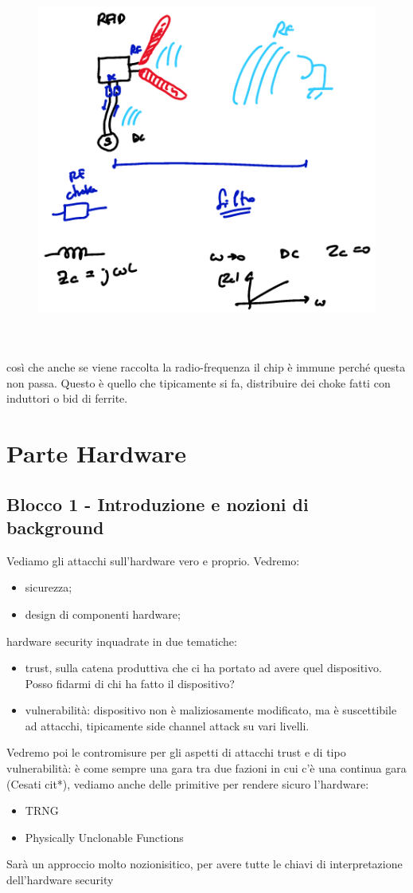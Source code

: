 \documentclass[oneside, 12pt]{extbook}
\begin{document}
\begin{figure}[!h]
	\includegraphics[scale=0.3]{immagini/schermi_chokes.png}
\end{figure}
\\\\così che anche se viene raccolta la radio-frequenza il chip è immune perché questa non passa. Questo è quello che tipicamente si fa, distribuire dei choke fatti con induttori o bid di ferrite.

\part{Parte Hardware}

\chapter{Blocco 1 - Introduzione e nozioni di background}
Vediamo gli attacchi sull'hardware vero e proprio. Vedremo:
\begin{itemize}
	\item sicurezza;
	\item design di componenti hardware;
\end{itemize}
hardware security inquadrate in due tematiche:
\begin{itemize}
	\item trust, sulla catena produttiva che ci ha portato ad avere quel dispositivo. Posso fidarmi di chi ha fatto il dispositivo?
	\item vulnerabilità: dispositivo non è maliziosamente modificato, ma è suscettibile ad attacchi, tipicamente side channel attack su vari livelli.
\end{itemize}
Vedremo poi le contromisure per gli aspetti di attacchi trust e di tipo vulnerabilità: è come sempre una gara tra due fazioni in cui c'è una continua gara (Cesati cit*), vediamo anche delle primitive per rendere sicuro l'hardware:
\begin{itemize}
	\item TRNG
	\item Physically Unclonable Functions
\end{itemize}
Sarà un approccio molto nozionisitico, per avere tutte le chiavi di interpretazione dell'hardware security
\end{document}
